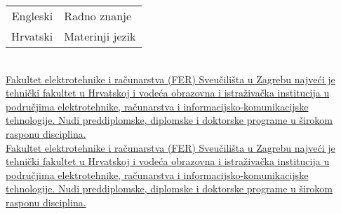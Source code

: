 \documentclass[theme]{cv_style}
\begin{document}
\begin{paracol}{2}
\begin{leftcolumn*}
{            
            \begin{minipage}[r]{\leftcolwidth}
                \begin{tabular}{r|l}
                    Engleski & Radno znanje\\[0.3em]
                    Hrvatski & Materinji jezik
                \end{tabular}
            \end{minipage}
            \vspace{\sectionspace}
        }
        \end{leftcolumn*}
        \begin{rightcolumn}\noindent \small
            \phantom{} \\ %
            \href{https://www.fer.unizg.hr/}{
            {Fakultet elektrotehnike i računarstva (FER) Sveučilišta u Zagrebu najveći je tehnički fakultet u Hrvatskoj i vodeća obrazovna i istraživačka institucija u područjima elektrotehnike, računarstva i informacijsko-komunikacijske tehnologije. Nudi preddiplomske, diplomske i doktorske programe u širokom rasponu disciplina.}}
            \vspace{\itemspace}\\
            \href{https://www.fer.unizg.hr/}{
            {Fakultet elektrotehnike i računarstva (FER) Sveučilišta u Zagrebu najveći je tehnički fakultet u Hrvatskoj i vodeća obrazovna i istraživačka institucija u područjima elektrotehnike, računarstva i informacijsko-komunikacijske tehnologije. Nudi preddiplomske, diplomske i doktorske programe u širokom rasponu disciplina.}}

\end{rightcolumn}
\end{paracol}
\end{document}

